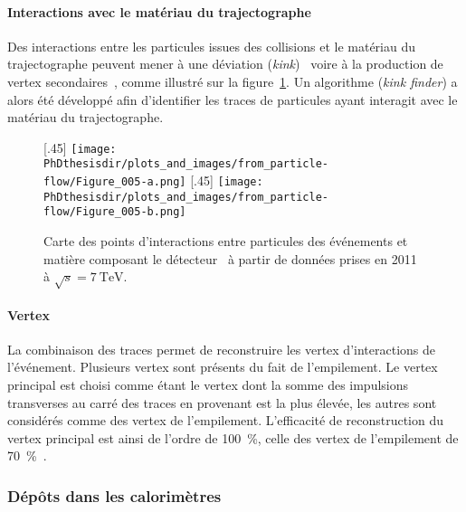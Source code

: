 \paragraph{Interactions avec le matériau du trajectographe}
Des interactions entre les particules issues des collisions et le matériau du trajectographe peuvent mener
à une déviation (\emph{kink})~\cite{moliere_scat_1,moliere_scat_2}
voire
à la production de vertex secondaires~\cite{particle-flow,CMS-TRK-17-001},
comme illustré sur la figure~\ref{fig-chapter-LHC-section-evt_reco-subsec-PF_elements-CMS-self-radio}.
Un algorithme (\emph{kink finder}) a alors été développé afin d'identifier les traces de particules ayant interagit avec le matériau du trajectographe.
\begin{figure}[h]
\centering
{}[.45\textwidth]
{\texttt{[image: \\PhDthesisdir/plots\_and\_images/from\_particle-flow/Figure\_005-a.png]}}
\hfill
{}[.45\textwidth]
{\texttt{[image: \\PhDthesisdir/plots\_and\_images/from\_particle-flow/Figure\_005-b.png]}}
\caption[Points d'interactions entre particules des événements et matière composant le détecteur.]{Carte des points d'interactions entre particules des événements et matière composant le détecteur~\cite{particle-flow,CMS-TRK-17-001} à partir de données prises en 2011 à $\sqrt{s}=\SI{7}{\TeV}$.}
\label{fig-chapter-LHC-section-evt_reco-subsec-PF_elements-CMS-self-radio}
\end{figure}
\paragraph{Vertex}
La combinaison des traces permet de reconstruire les vertex d'interactions de l'événement.
Plusieurs vertex sont présents du fait de l'empilement.
Le vertex principal est choisi comme étant le vertex dont la somme des impulsions transverses au carré des traces en provenant est la plus élevée, les autres sont considérés comme des vertex de l'empilement.
L'efficacité de reconstruction du vertex principal est ainsi de l'ordre de \SI{100}{\%}, celle des vertex de l'empilement de \SI{70}{\%}~\cite{JERC_RunI}.
\subsubsection{Dépôts dans les calorimètres}

